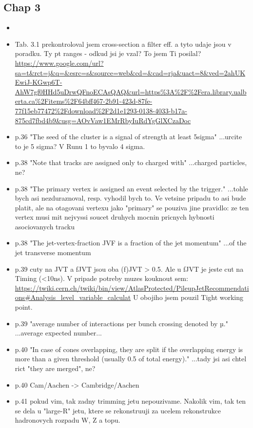 \subsection{Chap 3}
\begin{itemize} 
\item {}
\item Tab. 3.1 prekontroloval jsem cross-section a filter eff. a tyto udaje 
jsou v poradku. Ty pt ranges - odkud jsi je vzal? To jsem Ti posilal?
 \url{https://www.google.com/url?sa=t&rct=j&q=&esrc=s&source=web&cd=&cad=rja&uact=8&ved=2ahUKEwiJ-KGwp6T-AhW7gf0HHd5uDrwQFnoECAsQAQ&url=https%3A%2F%2Fera.library.ualberta.ca%2Fitems%2F64bff467-2b91-423d-87fe-77f15eb77472%2Fdownload%2F2d1e1293-0138-4033-b17a-875cd7fbd4b9&usg=AOvVaw1EMrRbyIuRdYgGlXCzaDoc}
\item p.36 "The seed of the cluster is a signal of strength at least 5sigma" 
...urcite to je 5 sigma? V Runu 1 to byvalo 4 sigma.
\item p.38 "Note that tracks are assigned only to charged with" ...charged 
particles, ne?
\item p.38 "The primary vertex is assigned an event selected by the 
trigger." ...tohle bych asi nezduraznoval, resp. vyhodil bych to. Ve 
vetsine pripadu to asi bude platit, ale na otagovani vertexu jako 
"primary" se pouziva jine pravidlo: ze ten vertex musi mit nejvyssi 
soucet druhych mocnin pricnych hybnosti asociovanych tracku
\item p.38 "The jet-vertex-fraction JVF is a fraction of the jet momentum" 
...of the jet transverse momentum
\item p.39 cuty na JVT a fJVT jsou oba (f)JVT > 0.5. Ale u fJVT je jeste cut 
na Timing (<10ns). V pripade potreby muzes kouknout sem: 
\url{https://twiki.cern.ch/twiki/bin/view/AtlasProtected/PileupJetRecommendations#Analysis_level_variable_calculat}
U obojiho jsem pouzil Tight working point.
\item p.39 "average number of interactions per bunch crossing denoted by µ." 
...average expected number...
\item p.40 "In case of cones overlapping, they are split if the overlapping 
energy is more than a given threshold (usually 0.5 of total energy)." 
...tady jsi asi chtel rict "they are merged", ne?
\item p.40 Cam/Aachen -> Cambridge/Aachen
\item p.41 pokud vim, tak zadny trimming jetu nepouzivame. Nakolik vim, tak 
ten se dela u "large-R" jetu, ktere se rekonstruuji za ucelem 
rekonstrukce hadronovych rozpadu W, Z a topu.
\end{itemize}

